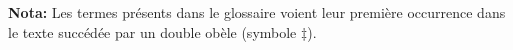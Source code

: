 \newlength{\currentparskip}
\setlength{\currentparskip}{\parskip}
\setlength{\parskip}{0pt}
\tableofcontents

\bigskip\null\bigskip

\noindent\textbf{Nota:} Les termes présents dans le glossaire voient leur première occurrence dans le texte succédée par un double obèle (symbole $\ddagger$).

\newpage
\begingroup
  \listoffigures
  \listoftables
  \listoflistings
\endgroup
\setlength{\parskip}{\currentparskip}